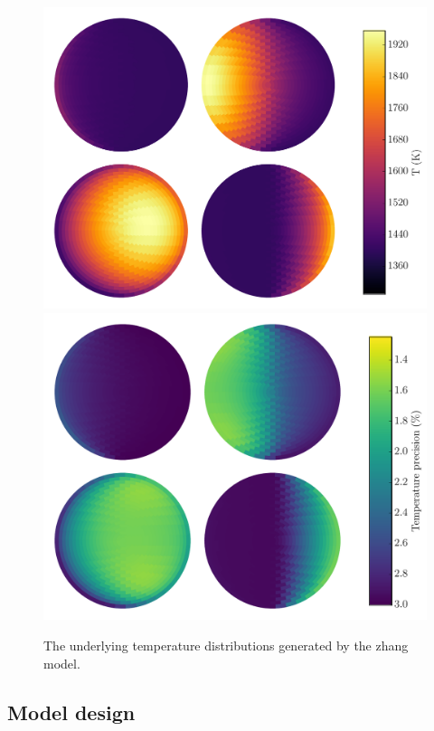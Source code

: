 \documentclass[a4paper,fleqn,usenatbib]{mnras}
\begin{document}
\begin{figure}
\begin{center}
\includegraphics[width=\columnwidth]{img/free_parameterstemp_map.pdf}
\includegraphics[width=\columnwidth]{img/free_parameterstemp_errs.pdf}
\caption{The underlying temperature distributions generated by the zhang model.}
\label{fig:best_fit_temp}
\end{center}
\end{figure}

\subsection{Model design}\label{sec:fitting}
\end{document}
